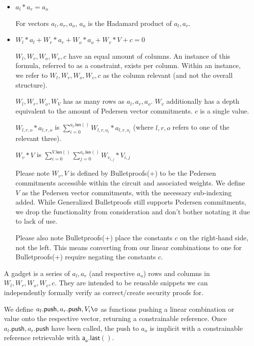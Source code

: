 \documentclass[]{article}
\begin{document}
\begin{itemize}
	\item
	$a_l * a_r = a_o$
	
	For vectors $a_l, a_r, a_o$, $a_o$ is the Hadamard product of $a_l, a_r$.
	\item
	$W_l * a_l + W_r * a_r + W_o * a_o + W_v * V + c = 0$
	
	$W_l, W_r, W_o, W_v, c$ have an equal amount of columns. An instance of this formula, referred to as a constraint, exists per column. Within an instance, we refer to $W_l, W_r, W_o, W_v, c$ as the column relevant (and not the overall structure).
	
	$W_l, W_r, W_o, W_V$ has as many rows as $a_l, a_r, a_o$. $W_v$ additionally has a depth equivalent to the amount of Pedersen vector commitments. $c$ is a single value.
	
    $W_{l,r,o} * a_{l,r,o}$ is $\sum^{a_l\mathsf{.len}()}_{i=0} W_{l,r,o_i} * a_{l,r,o_i}$ (where $l,r,o$ refers to one of the relevant three).
	
	$W_v * V$ is $\sum^{V\mathsf{.len}()}_{i=0} \sum^{a_l\mathsf{.len}()}_{j=0} W_{v_{i, j}} * V_{i, j}$

	Please note $W_v, V$ is defined by Bulletproofs(+) to be the Pedersen commitments accessible within the circuit and associated weights. We define $V$ as the Pedersen vector commitments, with the necessary sub-indexing added. While Generalized Bulletproofs still supports Pedersen commitments, we drop the functionality from consideration and don't bother notating it due to lack of use.
	
	Please also note Bulletproofs(+) place the constants $c$ on the right-hand side, not the left. This means converting from our linear combinations to one for Bulletproofs(+) require negating the constants $c$.
\end{itemize}

A gadget is a series of $a_l, a_r$ (and respective $a_o$) rows and columns in $W_l, W_r, W_o, W_v, c$. They are intended to be reusable snippets we can independently formally verify as correct/create security proofs for.

\newcommand{\p}{\mathsf{.push}}
\newcommand{\al}{a_l\p}
\newcommand{\ar}{a_r\p}
\newcommand{\aol}{\mathsf{a_o.last()}}

We define $\al, \ar, V_i\o$ as functions pushing a linear combination or value onto the respective vector, returning a constrainable reference. Once $\al, \ar$ have been called, the push to $a_o$ is implicit with a constrainable reference retrievable with $\aol$.
\end{document}
